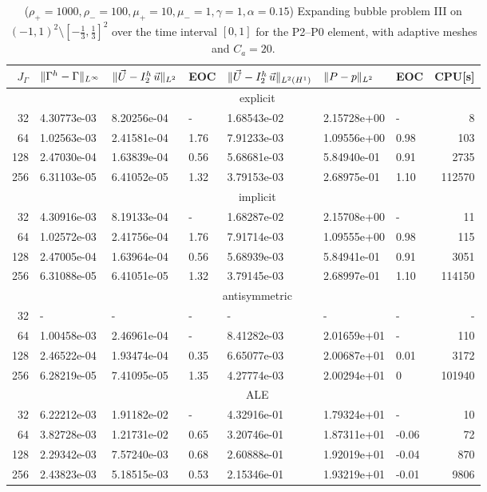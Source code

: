 \begin{table}
\center
\hspace*{-3.25cm}
\begin{tabular}{rllllllr}
\hline
$J_\Gamma$ & $\|\Gamma^h - \Gamma\|_{L^\infty}$ & $\|\vec U - I^h_{2}\,\vec u\|_{L^2}$ & EOC & $\|\vec U - I^h_{2}\,\vec u\|_{L^2(H^1)}$ & $\|P - p\|_{L^2}$ & EOC
& CPU[s] \\
\hline
& \multicolumn{7}{c}{explicit} \\
\hline
 32 & 4.30773e-03 & 8.20256e-04 &    - & 1.68543e-02 & 2.15728e+00 &    - &
8 \\
 64 & 1.02563e-03 & 2.41581e-04 & 1.76 & 7.91233e-03 & 1.09556e+00 & 0.98 &
103 \\
128 & 2.47030e-04 & 1.63839e-04 & 0.56 & 5.68681e-03 & 5.84940e-01 & 0.91 &
2735 \\
256 & 6.31103e-05 & 6.41052e-05 & 1.32 & 3.79153e-03 & 2.68975e-01 & 1.10 &
112570 \\
\hline
& \multicolumn{7}{c}{implicit} \\
\hline
 32 & 4.30916e-03 & 8.19133e-04 &    - & 1.68287e-02 & 2.15708e+00 &    - &
11 \\
 64 & 1.02572e-03 & 2.41756e-04 & 1.76 & 7.91714e-03 & 1.09555e+00 & 0.98 &
115 \\
128 & 2.47005e-04 & 1.63964e-04 & 0.56 & 5.68939e-03 & 5.84941e-01 & 0.91 &
3051 \\
256 & 6.31088e-05 & 6.41051e-05 & 1.32 & 3.79145e-03 & 2.68997e-01 & 1.10 &
114150 \\
\hline
& \multicolumn{7}{c}{antisymmetric} \\
\hline
 32 &           - &           - &    - &           - &           - &    - &
- \\
 64 & 1.00458e-03 & 2.46961e-04 &    - & 8.41282e-03 & 2.01659e+01 &    - &
110 \\
128 & 2.46522e-04 & 1.93474e-04 & 0.35 & 6.65077e-03 & 2.00687e+01 & 0.01 &
3172 \\
256 & 6.28219e-05 & 7.41095e-05 & 1.35 & 4.27774e-03 & 2.00294e+01 &    0 &
101940 \\
\hline
& \multicolumn{7}{c}{ALE} \\
\hline
 32 & 6.22212e-03 & 1.91182e-02 &    - & 4.32916e-01 & 1.79324e+01 &     - &
10 \\
 64 & 3.82728e-03 & 1.21731e-02 & 0.65 & 3.20746e-01 & 1.87311e+01 & -0.06 &
72 \\
128 & 2.29342e-03 & 7.57240e-03 & 0.68 & 2.60888e-01 & 1.92019e+01 & -0.04 &
870 \\
256 & 2.43823e-03 & 5.18515e-03 & 0.53 & 2.15346e-01 & 1.93219e+01 & -0.01 &
9806 \\
\hline
\end{tabular}
\hspace*{-3.25cm}
\caption[Navier--Stokes expanding bubble III errors P2--P0]
{($\rho_+ = 1000,\rho_- = 100,\mu_+ = 10,\mu_- =1,\gamma = 1,\alpha=0.15$)
Expanding bubble problem III on $(-1,1)^2\setminus[-\frac{1}{3},\frac{1}{3}]^2$
over the time interval $[0,1]$ for the P2--P0 element, with adaptive
meshes and $C_a=20$\textdegree.}
\label{tab:nsexpandingbubbleIIIp2p0}
\end{table}

